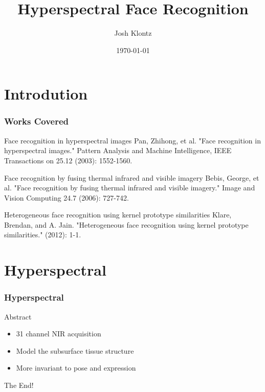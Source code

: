\documentclass{beamer}
\title[Hyperspectral]{Hyperspectral Face Recognition}
\author{Josh Klontz}
\date{\today}
\begin{document}
\begin{frame}
\titlepage
\end{frame}

\section{Introdution}
\begin{frame}
\frametitle{Works Covered}
\begin{block}{Face recognition in hyperspectral images}
Pan, Zhihong, et al. "Face recognition in hyperspectral images." Pattern Analysis and Machine Intelligence, IEEE Transactions on 25.12 (2003): 1552-1560.
\end{block}
\pause
\begin{block}{Face recognition by fusing thermal infrared and visible imagery}
Bebis, George, et al. "Face recognition by fusing thermal infrared and visible imagery." Image and Vision Computing 24.7 (2006): 727-742.
\end{block}
\pause
\begin{block}{Heterogeneous face recognition using kernel prototype similarities}
Klare, Brendan, and A. Jain. "Heterogeneous face recognition using kernel prototype similarities." (2012): 1-1.
\end{block}
\end{frame}

\section{Hyperspectral}
\begin{frame}
\frametitle{Hyperspectral}
\begin{block}{Abstract}
\begin{itemize}
\item 31 channel NIR acquisition
\item Model the subsurface tissue structure
\item More invariant to pose and expression
\end{itemize}
\end{block}
\end{frame}

\begin{frame}
\centerline{The End!}
\end{frame}

\end{document}
